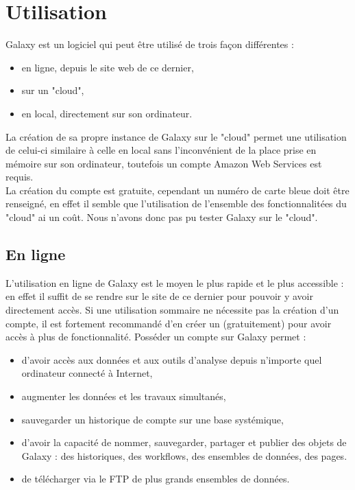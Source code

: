 \chapter{Utilisation}

Galaxy est un logiciel qui peut être utilisé de trois façon différentes : 

\begin{itemize}
\item en ligne, depuis le site web de ce dernier,
\item sur un "cloud",
\item en local, directement sur son ordinateur.\\
\end{itemize}

La création de sa propre instance de Galaxy sur le "cloud" permet une utilisation de celui-ci similaire à celle en local sans l'inconvénient de la place prise en mémoire sur son ordinateur, toutefois un compte Amazon Web Services est requis.\\

La création du compte est gratuite, cependant un numéro de carte bleue doit être renseigné, en effet il semble que l'utilisation de l'ensemble des fonctionnalitées du "cloud" ai un coût. Nous n'avons donc pas pu tester Galaxy sur le "cloud".\\

\section{En ligne}

L'utilisation en ligne de Galaxy est le moyen le plus rapide et le plus accessible : en effet il suffit de se rendre sur le site de ce dernier pour pouvoir y avoir directement accès. Si une utilisation sommaire ne nécessite pas la création d'un compte, il est fortement recommandé d'en créer un (gratuitement) pour avoir accès à plus de fonctionnalité. Posséder un compte sur Galaxy permet :\\

\begin{itemize}
\item d'avoir accès aux données et aux outils d'analyse depuis n'importe quel ordinateur connecté à Internet,
\item augmenter les données et les travaux simultanés,
\item sauvegarder un historique de compte sur une base systémique,
\item d'avoir la capacité de nommer, sauvegarder, partager et publier des objets de Galaxy : des historiques, des workflows, des ensembles de données, des pages.
\item de télécharger via le FTP de plus grands ensembles de données.\\
\end{itemize}

